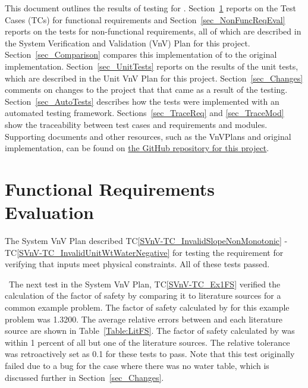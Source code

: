 \documentclass[12pt, titlepage]{article}
\newcommand{\tcref}[1]{TC\ref{#1}}
\begin{document}
This document outlines the results of testing for \progname{}. 
Section~\ref{sec_FuncReqEval} reports on the Test Cases (TCs) for functional 
requirements and Section~\ref{sec_NonFuncReqEval} reports on the tests for 
non-functional requirements, all of which are described in the System 
Verification and Validation (VnV) Plan for this project. 
Section~\ref{sec_Comparison} compares this implementation of \progname{} to the 
original implementation. Section~\ref{sec_UnitTests} reports on the results of 
the unit tests, which are described in the Unit VnV Plan for this project. 
Section~\ref{sec_Changes} comments on changes to the project that that came as 
a result of the testing. Section~\ref{sec_AutoTests} describes how the tests 
were implemented with an automated testing framework. 
Sections~\ref{sec_TraceReq} and \ref{sec_TraceMod} show the traceability 
between test cases and requirements and modules. Supporting documents and other 
resources, such as the VnVPlans and original implementation, can be found on 
\href{https://github.com/smiths/caseStudies/tree/master/CaseStudies/ssp}{the 
GitHub repository for this project}.

\section{Functional Requirements Evaluation} \label{sec_FuncReqEval}

The System VnV Plan described \tcref{SVnV-TC_InvalidSlopeNonMonotonic} - 
\tcref{SVnV-TC_InvalidUnitWtWaterNegative} for testing the requirement for 
verifying that inputs meet physical constraints. All of these tests passed. 

~\newline \noindent The next test in the System VnV Plan, \tcref{SVnV-TC_Ex1FS} 
verified 
the calculation of the factor of safety by comparing it to literature sources 
for a common example problem. The factor of safety calculated by \progname{} 
for 
this example problem was 1.3200. The average relative errors between 
\progname{} 
and each literature source are shown in Table~\ref{Table:LitFS}. The factor of 
safety calculated by \progname{} was within 1 percent of all but one of the 
literature sources. The relative tolerance was retroactively set as 0.1 for 
these tests to pass. Note that this test originally failed due to a bug for the 
case where there was no water table, which is discussed further in 
Section~\ref{sec_Changes}.
\end{document}
